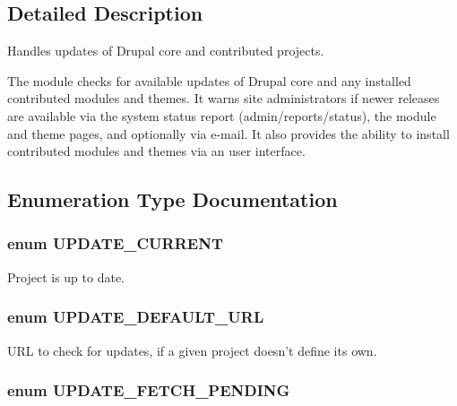 \subsection{Detailed Description}
Handles updates of Drupal core and contributed projects.

The module checks for available updates of Drupal core and any installed contributed modules and themes. It warns site administrators if newer releases are available via the system status report (admin/reports/status), the module and theme pages, and optionally via e-\/mail. It also provides the ability to install contributed modules and themes via an user interface. 

\subsection{Enumeration Type Documentation}
\hypertarget{update_8module_a2286dc81621d0ea6c92e731930dc7492}{
\subsubsection[{UPDATE\_\-CURRENT}]{\setlength{\rightskip}{0pt plus 5cm}enum {\bf UPDATE\_\-CURRENT}}}
\label{update_8module_a2286dc81621d0ea6c92e731930dc7492}
Project is up to date. \hypertarget{update_8module_aebab39aae38da226a778ab47bf74ae65}{
\subsubsection[{UPDATE\_\-DEFAULT\_\-URL}]{\setlength{\rightskip}{0pt plus 5cm}enum {\bf UPDATE\_\-DEFAULT\_\-URL}}}
\label{update_8module_aebab39aae38da226a778ab47bf74ae65}
URL to check for updates, if a given project doesn't define its own. \hypertarget{update_8module_ab6032ea4bca533dbb7ff44187401349b}{
\subsubsection[{UPDATE\_\-FETCH\_\-PENDING}]{\setlength{\rightskip}{0pt plus 5cm}enum {\bf UPDATE\_\-FETCH\_\-PENDING}}}
